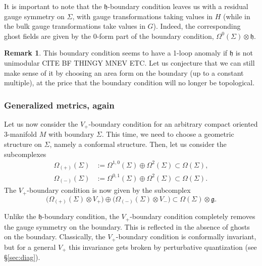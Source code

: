 \documentclass[a4paper]{amsart}
\theoremstyle{plain}
\theoremstyle{definition}
\newtheorem*{rem}{Remark}
\newcommand{\g}{\mathfrak{g}}
\newcommand{\h}{\mathfrak{h}}
\newcommand{\la}{\langle}
\newcommand{\ra}{\rangle}
\begin{document}
It is important to note that the $\h$-boundary condition leaves us with a residual gauge symmetry on $\Sigma$, with gauge transformations taking values in $H$ (while in the bulk gauge transformations take values in $G$). Indeed, the corresponding ghost fields are given by the 0-form part of the boundary condition, $\Omega^0(\Sigma)\otimes\h$.

\begin{rem}
This boundary condition seems to have a 1-loop anomaly if $\h$ is not unimodular {\color{red} CITE BF THINGY MNEV ETC}. Let us conjecture that we can still make sense of it by choosing an area form on the boundary (up to a constant multiple), at the price that the boundary condition will no longer be topological. 
\end{rem}

\subsubsection{Generalized metrics, again}\label{subsubsec:generalized_metrics_bc}
Let us now consider the $V_+$-boundary condition for an arbitrary compact oriented 3-manifold $M$ with boundary $\Sigma$. 
This time, we need to choose a geometric structure on $\Sigma$, namely a conformal structure. Then, let us consider the subcomplexes
\begin{align*}
\Omega_{(+)}(\Sigma)&:=\Omega^{1,0}(\Sigma)\oplus\Omega^2(\Sigma)\subset\Omega(\Sigma),\\
\Omega_{(-)}(\Sigma)&:=\Omega^{0,1}(\Sigma)\oplus\Omega^2(\Sigma)\subset\Omega(\Sigma).
\end{align*}
The $V_+$-boundary condition is now given by the subcomplex
$$\bigl(\Omega_{(+)}(\Sigma)\otimes V_+\bigr) \oplus \bigl(\Omega_{(-)}(\Sigma)\otimes V_-\bigr) \subset\Omega(\Sigma)\otimes\g.$$

Unlike the $\h$-boundary condition, the $V_+$-boundary condition completely removes the gauge symmetry on the boundary. This is reflected in the absence of ghosts on the boundary. Classically, the $V_+$-boundary condition is conformally invariant, but for a general $V_+$ this invariance gets broken by perturbative quantization (see \S\ref{sec:diag}).
\end{document}

